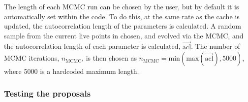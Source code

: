 The length of each MCMC run can be chosen by the user, but by default it is automatically set within the code. To do this,
at the same rate as the cache is updated, the autocorrelation length of the parameters is calculated. A random sample from the current
live points in chosen, and evolved via the MCMC, and the autocorrelation length of each parameter is calculated, $\vec{{\text{acl}}}$. The number
of MCMC iterations, $n_{\text{MCMC}}$, is then chosen as $n_{\text{MCMC}} = \text{min}(\text{max}(\vec{\text{acl}}), 5000)$, where 5000 is
a hardcoded maximum length.

\subsubsection{Testing the proposals}\label{sec:proposaltesting}

